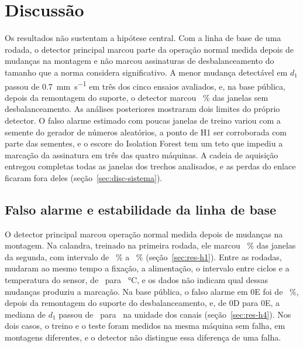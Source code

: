 \chapter{Discussão}\label{cap:discussao}

Os resultados não sustentam a hipótese central. Com a linha de base de uma rodada, o detector principal marcou parte da operação normal medida depois de mudanças na montagem e não marcou assinaturas de desbalanceamento do tamanho que a norma considera significativo. A menor mudança detectável em $d_1$ passou de \SI{0,7}{\milli\meter\per\second} em três dos cinco ensaios avaliados, e, na base pública, depois da remontagem do suporte, o detector marcou \hQuatroFracaoZero~\% das janelas sem desbalanceamento. As análises posteriores mostraram dois limites do próprio detector. O falso alarme estimado com poucas janelas de treino variou com a semente do gerador de números aleatórios, a ponto de H1 ser corroborada com parte das sementes, e o escore do Isolation Forest tem um teto que impediu a marcação da assinatura em três das quatro máquinas. A cadeia de aquisição entregou completas todas as janelas dos trechos analisados, e as perdas do enlace ficaram fora deles (seção~\ref{sec:disc-sistema}).

\section{Falso alarme e estabilidade da linha de base}\label{sec:disc-falso-alarme}

O detector principal marcou operação normal medida depois de mudanças na montagem. Na calandra, treinado na primeira rodada, ele marcou \hUmCalandraIFDireto~\% das janelas da segunda, com intervalo de \hUmCalandraIFDiretoInf~\% a \hUmCalandraIFDiretoSup~\% (seção~\ref{sec:res-h1}). Entre as rodadas, mudaram ao mesmo tempo a fixação, a alimentação, o intervalo entre ciclos e a temperatura do sensor, de \campoTempCalandraUm\ para \campoTempCalandraDois~\si{\celsius}, e os dados não indicam qual dessas mudanças produziu a marcação. Na base pública, o falso alarme em 0E foi de \hQuatroFracaoZero~\%, depois da remontagem do suporte do desbalanceamento, e, de 0D para 0E, a mediana de $d_1$ passou de \hQuatroDumMedianaTreino\ para \hQuatroDumMedianaZero\ na unidade dos canais (seção~\ref{sec:res-h4}). Nos dois casos, o treino e o teste foram medidos na mesma máquina sem falha, em montagens diferentes, e o detector não distingue essa diferença de uma falha.

